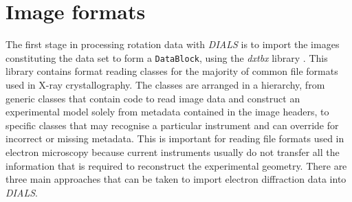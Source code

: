 \documentclass[preprint]{iucr}
\newcommand{\dxtbx}{\emph{dxtbx}\xspace}
\newcommand{\dials}{\emph{DIALS}\xspace}
\newcommand{\code}{\texttt}
\begin{document}
\section{Image formats}

The first stage in processing rotation data with \dials is to import the images
constituting the data set to form a \code{DataBlock}, using the \dxtbx library
\cite{Parkhurst2014}. This library contains format reading classes for the
majority of common file formats used in X-ray crystallography. The classes are
arranged in a hierarchy, from generic classes that contain code to read image
data and construct an experimental model solely from metadata contained in the
image headers, to specific classes that may recognise a particular instrument
and can override for incorrect or missing metadata. This is important for
reading file formats used in electron microscopy because current instruments
usually do not transfer all the information that is required to reconstruct the
experimental geometry. There are three main approaches that can be taken to
import electron diffraction data into \dials.
\end{document}
